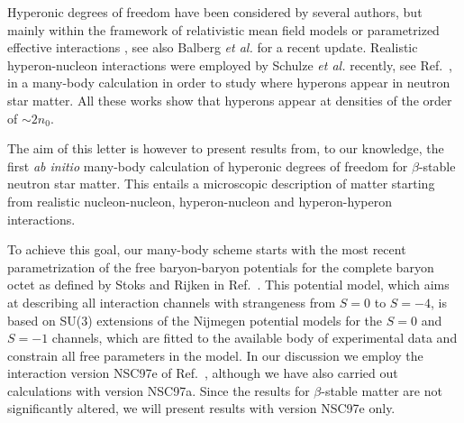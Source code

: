 Hyperonic degrees of freedom have been considered by several authors,
but mainly within the framework of relativistic 
mean field models \cite{glen97,prakash97,pke95,ms96} or parametrized
effective interactions \cite{bg97}, see also Balberg {\em et al.} \cite{blc99}
for a recent update. Realistic hyperon-nucleon interactions
were employed by Schulze {\em et al.}  recently, see Ref.\ \cite{bbs98},
in a many-body calculation in order to study 
where hyperons appear in neutron star matter.  
All these works show that hyperons appear at densities of the order of
$\sim 2n_0$.

The aim of this letter is 
however to present results from, to our knowledge,
 the first  {\em ab initio}
many-body calculation of hyperonic degrees of freedom 
for $\beta$-stable neutron star matter. 
This entails a microscopic
description of matter starting from 
realistic nucleon-nucleon, hyperon-nucleon
and hyperon-hyperon interactions. 

To achieve this goal, 
our many-body scheme starts with the most recent 
parametrization
of the free baryon-baryon potentials 
for the complete  baryon octet
as defined by Stoks and Rijken in Ref.\ 
\cite{sr99}. 
This potential model, which aims at describing all 
interaction channels
with strangeness from $S=0$ to $S=-4$, 
is based on SU(3) extensions
of the Nijmegen potential models \cite{rsy98} 
for the $S=0$ and $S=-1$ channels, which
are fitted to the available body of experimental 
data and constrain all free parameters in the model. 
In our discussion we employ 
the interaction version NSC97e of Ref.\ \cite{sr99}, although
we have also carried out calculations with version NSC97a. 
Since the results for $\beta$-stable matter are not significantly altered,
we will present results with version NSC97e only. 

